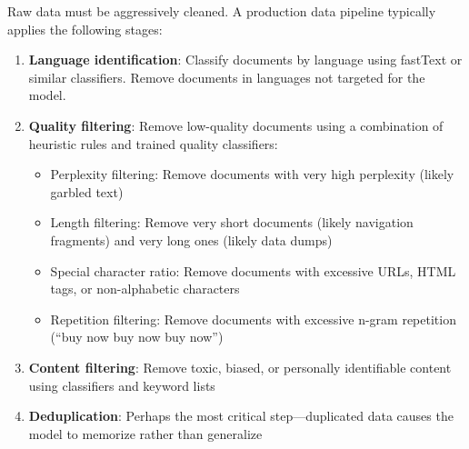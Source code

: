 Raw data must be aggressively cleaned. A production data pipeline typically applies the following stages:

\begin{enumerate}[leftmargin=*]
    \item \textbf{Language identification}: Classify documents by language using fastText or similar classifiers. Remove documents in languages not targeted for the model.
    \item \textbf{Quality filtering}: Remove low-quality documents using a combination of heuristic rules and trained quality classifiers:
    \begin{itemize}
        \item Perplexity filtering: Remove documents with very high perplexity (likely garbled text)
        \item Length filtering: Remove very short documents (likely navigation fragments) and very long ones (likely data dumps)
        \item Special character ratio: Remove documents with excessive URLs, HTML tags, or non-alphabetic characters
        \item Repetition filtering: Remove documents with excessive n-gram repetition (``buy now buy now buy now'')
    \end{itemize}
    \item \textbf{Content filtering}: Remove toxic, biased, or personally identifiable content using classifiers and keyword lists
    \item \textbf{Deduplication}: Perhaps the most critical step---duplicated data causes the model to memorize rather than generalize
\end{enumerate}

